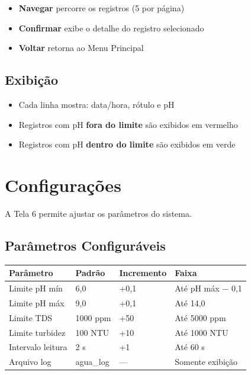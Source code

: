 \documentclass[12pt,a4paper]{article}
\begin{document}
\begin{itemize}[nosep]
  \item \textbf{Navegar} percorre os registros (5 por página)
  \item \textbf{Confirmar} exibe o detalhe do registro selecionado
  \item \textbf{Voltar} retorna ao Menu Principal
\end{itemize}

\subsection{Exibição}

\begin{itemize}[nosep]
  \item Cada linha mostra: data/hora, rótulo e pH
  \item Registros com pH \textbf{fora do limite} são exibidos em \textcolor{vermelho}{vermelho}
  \item Registros com pH \textbf{dentro do limite} são exibidos em \textcolor{verde}{verde}
\end{itemize}

\section{Configurações}

A Tela 6 permite ajustar os parâmetros do sistema.

\subsection{Parâmetros Configuráveis}

\begin{tabularx}{\textwidth}{l l l X}
\toprule
\textbf{Parâmetro} & \textbf{Padrão} & \textbf{Incremento} & \textbf{Faixa} \\
\midrule
Limite pH mín & 6,0 & +0,1 & Até pH máx $-$ 0,1 \\
Limite pH máx & 9,0 & +0,1 & Até 14,0 \\
Limite TDS & 1000 ppm & +50 & Até 5000 ppm \\
Limite turbidez & 100 NTU & +10 & Até 1000 NTU \\
Intervalo leitura & 2 s & +1 & Até 60 s \\
Arquivo log & agua\_log & --- & Somente exibição \\
\bottomrule
\end{tabularx}
\end{document}
